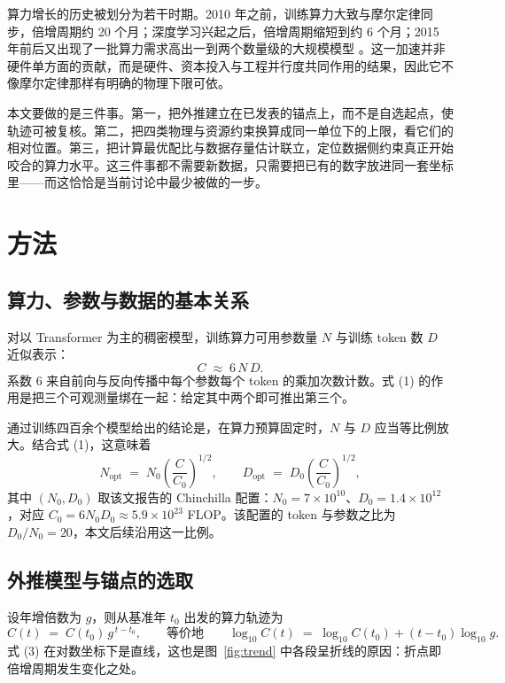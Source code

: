 \documentclass[11pt,a4paper]{article}
\begin{document}
算力增长的历史被划分为若干时期。2010 年之前，训练算力大致与摩尔定律同步，倍增周期约 20 个月；深度学习兴起之后，倍增周期缩短到约 6 个月；2015 年前后又出现了一批算力需求高出一到两个数量级的大规模模型 \citep{sevilla2022}。这一加速并非硬件单方面的贡献，而是硬件、资本投入与工程并行度共同作用的结果，因此它不像摩尔定律那样有明确的物理下限可依。

本文要做的是三件事。第一，把外推建立在已发表的锚点上，而不是自选起点，使轨迹可被复核。第二，把四类物理与资源约束换算成同一单位下的上限，看它们的相对位置。第三，把计算最优配比与数据存量估计联立，定位数据侧约束真正开始咬合的算力水平。这三件事都不需要新数据，只需要把已有的数字放进同一套坐标里——而这恰恰是当前讨论中最少被做的一步。

\section{方法}

\subsection{算力、参数与数据的基本关系}

对以 Transformer 为主的稠密模型，训练算力可用参数量 $N$ 与训练 token 数 $D$ 近似表示：
\begin{equation}
C \;\approx\; 6\,N\,D .
\end{equation}
系数 6 来自前向与反向传播中每个参数每个 token 的乘加次数计数。式 (1) 的作用是把三个可观测量绑在一起：给定其中两个即可推出第三个。

\citet{hoffmann2022} 通过训练四百余个模型给出的结论是，在算力预算固定时，$N$ 与 $D$ 应当等比例放大。结合式 (1)，这意味着
\begin{equation}
N_{\mathrm{opt}} \;=\; N_0\left(\frac{C}{C_0}\right)^{1/2},
\qquad
D_{\mathrm{opt}} \;=\; D_0\left(\frac{C}{C_0}\right)^{1/2},
\end{equation}
其中 $(N_0, D_0)$ 取该文报告的 Chinchilla 配置：$N_0 = 7\times10^{10}$、$D_0 = 1.4\times10^{12}$，对应 $C_0 = 6N_0D_0 \approx 5.9\times10^{23}$ FLOP。该配置的 token 与参数之比为 $D_0/N_0 = 20$，本文后续沿用这一比例。

\subsection{外推模型与锚点的选取}

设年增倍数为 $g$，则从基准年 $t_0$ 出发的算力轨迹为
\begin{equation}
C(t) \;=\; C(t_0)\, g^{\,t-t_0},
\qquad\text{等价地}\qquad
\log_{10} C(t) \;=\; \log_{10} C(t_0) + (t-t_0)\log_{10} g .
\end{equation}
式 (3) 在对数坐标下是直线，这也是图~\ref{fig:trend} 中各段呈折线的原因：折点即倍增周期发生变化之处。
\end{document}
